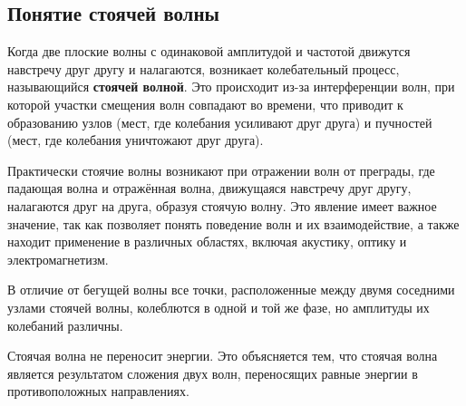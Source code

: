 \documentclass[referat,times]{SCWorks}
\begin{document}
\subsection{Понятие стоячей волны}
\par Когда две плоские волны с одинаковой амплитудой и частотой движутся навстречу друг другу и налагаются, возникает колебательный процесс, называющийся \textbf{стоячей волной}. Это происходит из-за интерференции волн, при которой участки смещения волн совпадают во времени, что приводит к образованию узлов (мест, где колебания усиливают друг друга) и пучностей (мест, где колебания уничтожают друг друга).
\par Практически стоячие волны возникают при отражении волн от преграды, где падающая волна и отражённая волна, движущаяся навстречу друг другу, налагаются друг на друга, образуя стоячую волну. Это явление имеет важное значение, так как позволяет понять поведение волн и их взаимодействие, а также находит применение в различных областях, включая акустику, оптику и электромагнетизм.
\par В отличие от бегущей волны все точки, расположенные между двумя соседними узлами стоячей волны, колеблются в одной и той же фазе, но амплитуды их колебаний различны.
\par Стоячая волна не переносит энергии. Это объясняется тем, что стоячая волна является результатом сложения двух волн, переносящих равные энергии в противоположных направлениях.
\end{document}
